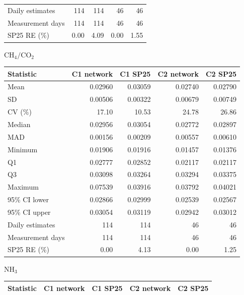 \begin{table}
\begin{minipage}[t]{0.48\textwidth}
\begin{tabular}{lrrrr}
Daily estimates & 114 & 114 & 46 & 46
\\
Measurement days & 114 & 114 & 46 & 46
\\
SP25 RE (\%) & 0.00 & 4.09 & 0.00 & 1.55
\\
\bottomrule
\end{tabular}
\end{minipage}
\hfill
\begin{minipage}[t]{0.48\textwidth}\centering\textbf{$\mathrm{CH_4}/\mathrm{CO_2}$}\par\vspace{1mm}
\begin{tabular}{lrrrr}
\toprule
Statistic & C1 network & C1 SP25 & C2 network & C2 SP25\\
\midrule
Mean & 0.02960 & 0.03059 & 0.02740 & 0.02790
\\
SD & 0.00506 & 0.00322 & 0.00679 & 0.00749
\\
CV (\%) & 17.10 & 10.53 & 24.78 & 26.86
\\
Median & 0.02956 & 0.03054 & 0.02772 & 0.02897
\\
MAD & 0.00156 & 0.00209 & 0.00557 & 0.00610
\\
Minimum & 0.01906 & 0.01916 & 0.01457 & 0.01376
\\
Q1 & 0.02777 & 0.02852 & 0.02117 & 0.02117
\\
Q3 & 0.03098 & 0.03264 & 0.03294 & 0.03375
\\
Maximum & 0.07539 & 0.03916 & 0.03792 & 0.04021
\\
95\% CI lower & 0.02866 & 0.02999 & 0.02539 & 0.02567
\\
95\% CI upper & 0.03054 & 0.03119 & 0.02942 & 0.03012
\\
Daily estimates & 114 & 114 & 46 & 46
\\
Measurement days & 114 & 114 & 46 & 46
\\
SP25 RE (\%) & 0.00 & 4.13 & 0.00 & 1.25
\\
\bottomrule
\end{tabular}
\end{minipage}
\par\vspace{2mm}
\begin{minipage}[t]{0.48\textwidth}\centering\textbf{$\mathrm{NH_3}$}\par\vspace{1mm}
\begin{tabular}{lrrrr}
\toprule
Statistic & C1 network & C1 SP25 & C2 network & C2 SP25\\
\midrule

\end{tabular}
\end{minipage}
\end{table}
